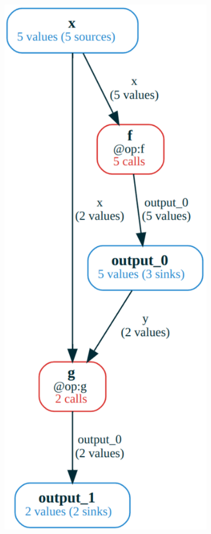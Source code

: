 \documentclass{article} %
\begin{document}
\begin{figure}[htbp]
\begin{minipage}[b]{0.45\textwidth}
\begin{subfigure}[b]{\textwidth}
            \includegraphics[width=\textwidth]{img/cf.pdf}

\end{subfigure}
\end{minipage}
\end{figure}
\end{document}
